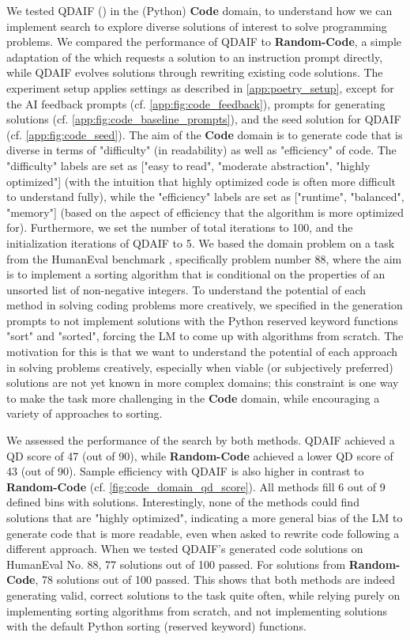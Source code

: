 We tested QDAIF (\qdaifrewrite) in the (Python) \textbf{Code} domain, to understand how we can implement search to explore diverse solutions of interest to solve programming problems. We compared the performance of QDAIF to \textbf{Random-Code}, a simple adaptation of the \poembaseone{} which requests a solution to an instruction prompt directly, while QDAIF evolves solutions through rewriting existing code solutions. The experiment setup applies settings as described in \cref{app:poetry_setup}, except for the AI feedback prompts (cf. \cref{app:fig:code_feedback}), prompts for generating solutions (cf. \cref{app:fig:code_baseline_prompts}), and the seed solution for QDAIF (cf. \cref{app:fig:code_seed}). The aim of the \textbf{Code} domain is to generate code that is diverse in terms of "difficulty" (in readability) as well as "efficiency" of code. The "difficulty" labels are set as ["easy to read", "moderate abstraction", "highly optimized"] (with the intuition that highly optimized code is often more difficult to understand fully), while the "efficiency" labels are set as ["runtime", "balanced", "memory"] (based on the aspect of efficiency that the algorithm is more optimized for). Furthermore, we set the number of total iterations to 100, and the initialization iterations of QDAIF to 5. We based the domain problem on a task from the HumanEval benchmark \citep{chen2021codex}, specifically problem number 88, where the aim is to implement a sorting algorithm that is conditional on the properties of an unsorted list of non-negative integers. To understand the potential of each method in solving coding problems more creatively, we specified in the generation prompts to not implement solutions with the Python reserved keyword functions "sort" and "sorted", forcing the LM to come up with algorithms from scratch. The motivation for this is that we want to understand the potential of each approach in solving problems creatively, especially when viable (or subjectively preferred) solutions are not yet known in more complex domains; this constraint is one way to make the task more challenging in the \textbf{Code} domain, while encouraging a variety of approaches to sorting.

We assessed the performance of the search by both methods. QDAIF achieved a QD score of 47 (out of 90), while \textbf{Random-Code} achieved a lower QD score of 43 (out of 90). Sample efficiency with QDAIF is also higher in contrast to \textbf{Random-Code} (cf. \cref{fig:code_domain_qd_score}). All methods fill 6 out of 9 defined bins with solutions. Interestingly, none of the methods could find solutions that are "highly optimized", indicating a more general bias of the LM to generate code that is more readable, even when asked to rewrite code following a different approach. When we tested QDAIF's generated code solutions on HumanEval No. 88, 77 solutions out of 100 passed. For solutions from \textbf{Random-Code}, 78 solutions out of 100 passed. This shows that both methods are indeed generating valid, correct solutions to the task quite often, while relying purely on implementing sorting algorithms from scratch, and not implementing solutions with the default Python sorting (reserved keyword) functions.

